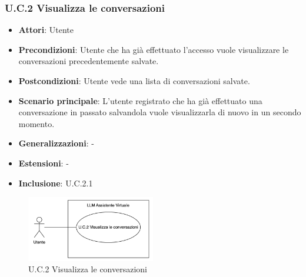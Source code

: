 \subsubsection{U.C.2 Visualizza le conversazioni}
\begin{itemize}
    \item \textbf{Attori}: Utente
    \item \textbf{Precondizioni}: Utente che ha già effettuato l’accesso vuole visualizzare le conversazioni precedentemente salvate.
    \item \textbf{Postcondizioni}: Utente vede una lista di conversazioni salvate.
    \item \textbf{Scenario principale}: L’utente registrato che ha già effettuato una conversazione in passato salvandola vuole visualizzarla di nuovo in un secondo momento.
    \item \textbf{Generalizzazioni}: -
    \item \textbf{Estensioni}: -
    \item \textbf{Inclusione}: U.C.2.1
\end{itemize}
\begin{figure}[h!]
    \centering
    \includegraphics[width=0.5\textwidth]{img/UC2.png}
    \caption{U.C.2 Visualizza le conversazioni}
\end{figure}
